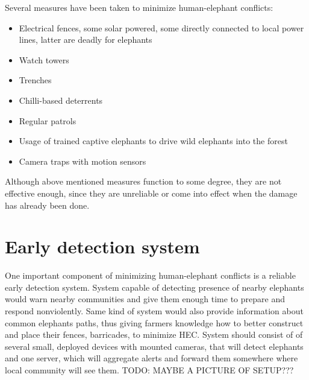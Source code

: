 Several measures have been taken to minimize human-elephant conflicts:
\begin{itemize}
    \item Electrical fences, some solar powered, some directly connected to local power lines, latter are deadly for elephants
    \item Watch towers
    \item Trenches
    \item Chilli-based deterrents
    \item Regular patrols
    \item Usage of trained captive elephants to drive wild elephants into the forest
    \item Camera traps with motion sensors
\end{itemize}

Although above mentioned measures function to some degree, they are not effective enough, since they are unreliable or come into effect when the damage has already been done\cite{wildlabs}. 

\section{ Early detection system}

One important component of minimizing human-elephant conflicts is a reliable early detection system. 
System capable of detecting presence of nearby elephants would warn nearby communities and give them enough time to prepare and respond nonviolently.
Same kind of system would also provide information about common elephants paths, thus giving farmers knowledge how to better construct and place their fences, barricades, to minimize HEC.
System should consist of of several small, deployed devices with mounted cameras, that will detect elephants and one server, which will aggregate alerts and forward them somewhere where local community will see them.
TODO: MAYBE A PICTURE OF SETUP???

